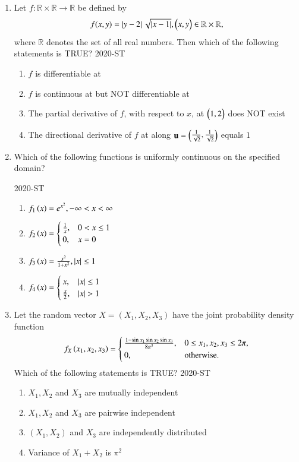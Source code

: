\documentclass[journal]{IEEEtran}
\begin{document}
\begin{enumerate}
\item Let $f : \mathbb{R} \times \mathbb{R} \to \mathbb{R}$ be defined by
\begin{align*}
 f(x, y) = \left\vert y - 2\right\vert \sqrt{\left\vert x - 1\right\vert}, \begin{pmatrix}x, y\end{pmatrix} \in \mathbb{R} \times \mathbb{R},   
\end{align*}
where  $\mathbb{R}$ denotes the set of all real numbers. Then which of the following statements is TRUE?
\hfill{2020-ST}
\begin{enumerate}
    \item $f$ is differentiable at 
    \item $f$ is continuous at  but NOT differentiable at 
    \item The partial derivative of  $f$, with respect to  $x$, at $\begin{pmatrix}1,2\end{pmatrix}$ does NOT exist
    \item The directional derivative of  $f$ at  along  $\mathbf{u} = \begin{pmatrix}\frac{1}{\sqrt{2}}, \frac{1}{\sqrt{2}}\end{pmatrix}$ equals $1$
\end{enumerate}

\item Which of the following functions is uniformly continuous on the 
specified domain? 

\hfill{2020-ST}

\begin{enumerate}
    \item $f_1\left(x\right) = e^{x^2}, -\infty < x < \infty$
    \item $f_2\left(x\right) = \begin{cases} \frac{1}{x}, & 0 < x \leq 1 \\ 0, & x = 0 \end{cases}$
    \item $f_3\left(x\right) = \frac{x^2}{1 + x^2}, \left\vert x\right\vert \leq 1$
    \item $f_4\left(x\right) = \begin{cases} x, & \left\vert x\right\vert \leq 1 \\ \frac{x}{2}, & \left\vert x\right\vert > 1 \end{cases}$
\end{enumerate}
\item Let the random vector $X = (X_1, X_2, X_3)$ have the joint probability density function
\begin{align*}
f_X\left(x_1, x_2, x_3\right) = \begin{cases}
\frac{1 - \sin x_1 \sin x_2 \sin x_3}{8 \pi^3}, & 0 \leq x_1, x_2, x_3 \leq 2 \pi, \\
0, & \text{otherwise}.
\end{cases}
\end{align*}
Which of the following statements is TRUE?
\hfill{2020-ST}
\begin{enumerate}
    \item $X_1, X_2$ and $X_3$ are mutually independent
    \item $X_1, X_2$ and $X_3$ are pairwise independent
    \item $(X_1, X_2)$ and $X_3$ are independently distributed
    \item Variance of $X_1 + X_2$ is $\pi^2$
\end{enumerate}


\end{enumerate}
\end{document}
